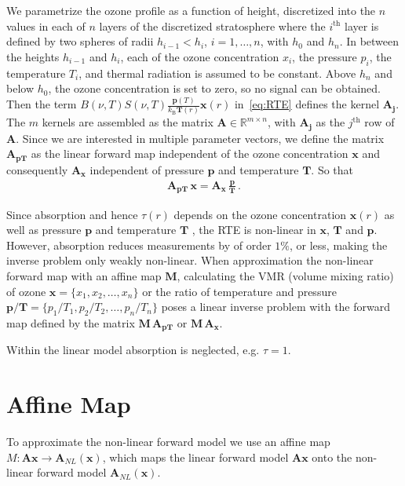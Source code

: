 We parametrize the ozone profile as a function of height, discretized into the $n$ values in each of $n$ layers of the discretized stratosphere where the $i^\text{th}$ layer is defined by two spheres of radii  $h_{i-1} < h_{i}$, $i = 1, \dots, n$, with $h_0$ and $h_{n} $.
In between the heights $h_{i-1}$ and $h_{i}$, each of the ozone concentration $x_{i}$, the pressure $p_{i}$, the temperature $T_{i}$, and thermal radiation is assumed to be constant.
Above $h_{n}$ and below $h_0$, the ozone concentration is set to zero, so no signal can be obtained.
Then the term $ B(\nu,T) S(\nu, T)   \frac{\bm{p}(T)}{k_{\text{B}} \bm{T}(r)}  \bm{x}(r)$ in~\eqref{eq:RTE} defines the kernel $\bm{A_{j}}$. The $m$ kernels are assembled as the matrix $\bm{A} \in \mathbb{R}^{m \times n}$, with $\bm{A_{j}}$ as the $j^\text{th}$ row of $\bm{A}$.
Since we are interested in multiple parameter vectors, we define the matrix $\bm{A_{pT}}$ as the linear forward map independent of the ozone concentration $\bm{x}$ and consequently $\bm{A_{x}}$ independent of pressure $\bm{p}$ and temperature $\bm{T}$.
So that
\begin{align}
	\bm{A_{pT}} \, \bm{x} = \bm{A_{x}} \,
	\frac{ \bm{p}}{\bm{T}} \, .
\end{align}

Since absorption and hence  $\tau(r)$ depends on the ozone concentration $\bm{x}(r)$ as well as pressure $\bm{p}$ and temperature $\bm{T}$ , the RTE is non-linear in $\bm{x}$, $\bm{T}$ and $\bm{p}$. However, absorption reduces measurements by of order $1\%$, or less, making the inverse problem only weakly non-linear. 
When approximation the non-linear forward map with an affine map $\bm{M}$, calculating the VMR (volume mixing ratio) of ozone $\bm{x}=\{x_1,x_2,\ldots,x_n\}$ or the ratio of temperature and pressure $\bm{p}/\bm{T} = \{p_1/T_1,p_2/T_2,\ldots,p_n/T_n\} $ poses a linear inverse problem with the forward map defined by the matrix $\bm{M} \, \bm{A_{pT}}$ or $\bm{M} \, \bm{A_x}$.

Within the linear model absorption is neglected, e.g. $\tau = 1$.
\section{Affine Map}

To approximate the non-linear forward model we use an affine map $ M:\bm{A} \bm{x} \rightarrow \bm{A}_{NL} (\bm{x}) $, which maps the linear forward model $\bm{A}\bm{x}$ onto the non-linear forward model $\bm{A}_{NL}(\bm{x}) $.


